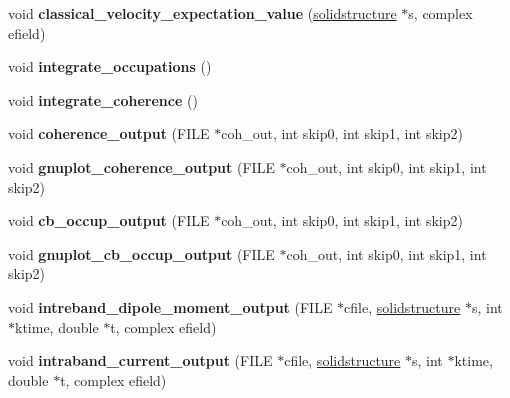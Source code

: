 \begin{DoxyCompactItemize}
void {\bfseries classical\+\_\+velocity\+\_\+expectation\+\_\+value} (\hyperlink{classsolidstructure}{solidstructure} $\ast$s, complex efield)
\item 
\mbox{\label{classobservables_a104b7315eec4b8275815f78c15968036}} 
void {\bfseries integrate\+\_\+occupations} ()
\item 
\mbox{\label{classobservables_adf07f3c18716e06fec4af410e97c6723}} 
void {\bfseries integrate\+\_\+coherence} ()
\item 
\mbox{\label{classobservables_a2755d449f2124854deaf04955f4636e3}} 
void {\bfseries coherence\+\_\+output} (F\+I\+LE $\ast$coh\+\_\+out, int skip0, int skip1, int skip2)
\item 
\mbox{\label{classobservables_a146daad8f0194c55279056cb813a006d}} 
void {\bfseries gnuplot\+\_\+coherence\+\_\+output} (F\+I\+LE $\ast$coh\+\_\+out, int skip0, int skip1, int skip2)
\item 
\mbox{\label{classobservables_a27adae6e8fe974512ce18ecf7e8108fd}} 
void {\bfseries cb\+\_\+occup\+\_\+output} (F\+I\+LE $\ast$coh\+\_\+out, int skip0, int skip1, int skip2)
\item 
\mbox{\label{classobservables_a7155efa76adfb455169be9902292f40b}} 
void {\bfseries gnuplot\+\_\+cb\+\_\+occup\+\_\+output} (F\+I\+LE $\ast$coh\+\_\+out, int skip0, int skip1, int skip2)
\item 
\mbox{\label{classobservables_ac8cbe3d28d9b0d5e14fa3dc9824d8741}} 
void {\bfseries intreband\+\_\+dipole\+\_\+moment\+\_\+output} (F\+I\+LE $\ast$cfile, \hyperlink{classsolidstructure}{solidstructure} $\ast$s, int $\ast$ktime, double $\ast$t, complex efield)
\item 
\mbox{\label{classobservables_a7a5d41bbcee4b7d947ad460632c38ece}} 
void {\bfseries intraband\+\_\+current\+\_\+output} (F\+I\+LE $\ast$cfile, \hyperlink{classsolidstructure}{solidstructure} $\ast$s, int $\ast$ktime, double $\ast$t, complex efield)
\end{DoxyCompactItemize}

